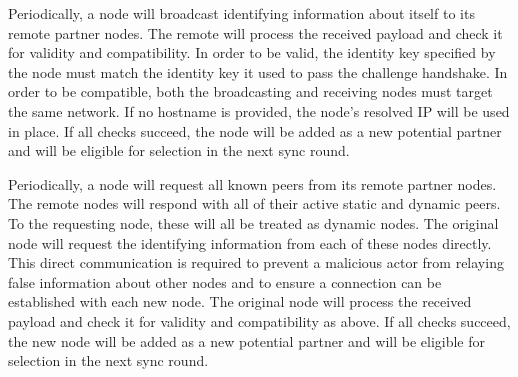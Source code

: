 Periodically, a node will broadcast identifying information about itself to its remote partner nodes.
The remote will process the received payload and check it for validity and compatibility.
In order to be valid, the identity key specified by the node must match the identity key it used to pass the challenge handshake.
In order to be compatible, both the broadcasting and receiving nodes must target the same network.
If no hostname is provided, the node's resolved IP will be used in place.
If all checks succeed, the node will be added as a new potential partner and will be eligible for selection in the next sync round.

Periodically, a node will request all known peers from its remote partner nodes.
The remote nodes will respond with all of their active static and dynamic peers.
To the requesting node, these will all be treated as dynamic nodes.
The original node will request the identifying information from each of these nodes directly.
This direct communication is required to prevent a malicious actor from relaying false information about other nodes and to ensure a connection can be established with each new node.
The original node will process the received payload and check it for validity and compatibility as above.
If all checks succeed, the new node will be added as a new potential partner and will be eligible for selection in the next sync round.
